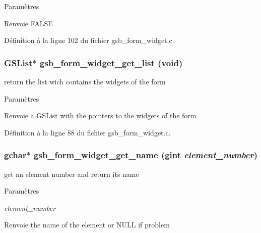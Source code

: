 \begin{DoxyParams}{Paramètres}
\item[{\em }]\end{DoxyParams}
\begin{DoxyReturn}{Renvoie}
FALSE 
\end{DoxyReturn}


Définition à la ligne 102 du fichier gsb\_\-form\_\-widget.c.

\subsubsection[{gsb\_\-form\_\-widget\_\-get\_\-list}]{\setlength{\rightskip}{0pt plus 5cm}GSList$\ast$ gsb\_\-form\_\-widget\_\-get\_\-list (void)}\label{gsb__form__widget_8c_ad4885fdd3bce3607cf1aba2765864c35}
return the list wich contains the widgets of the form


\begin{DoxyParams}{Paramètres}
\item[{\em }]\end{DoxyParams}
\begin{DoxyReturn}{Renvoie}
a GSList with the pointers to the widgets of the form 
\end{DoxyReturn}


Définition à la ligne 88 du fichier gsb\_\-form\_\-widget.c.

\subsubsection[{gsb\_\-form\_\-widget\_\-get\_\-name}]{\setlength{\rightskip}{0pt plus 5cm}gchar$\ast$ gsb\_\-form\_\-widget\_\-get\_\-name (gint {\em element\_\-number})}\label{gsb__form__widget_8c_a48e129aec71bef3117effe95f85c4a12}
get an element number and return its name


\begin{DoxyParams}{Paramètres}
\item[{\em element\_\-number}]\end{DoxyParams}
\begin{DoxyReturn}{Renvoie}
the name of the element or NULL if problem 
\end{DoxyReturn}


